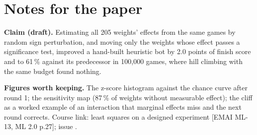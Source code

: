 \documentclass{../polyexp}
\begin{document}
\section{Notes for the paper}
\textbf{Claim (draft).} Estimating all 205 weights' effects from the same games by random sign perturbation, and moving only the weights whose effect passes a significance test, improved a hand-built heuristic bot by 2.0 points of finish score and to 61\,\% against its predecessor in 100,000 games, where hill climbing with the same budget found nothing.

\textbf{Figures worth keeping.} The z-score histogram against the chance curve after round 1; the sensitivity map (87\,\% of weights without measurable effect); the cliff as a worked example of an interaction that marginal effects miss and the next round corrects. Course link: least squares on a designed experiment [EMAI ML-13, ML 2.0 p.27]; issue .

\end{document}
